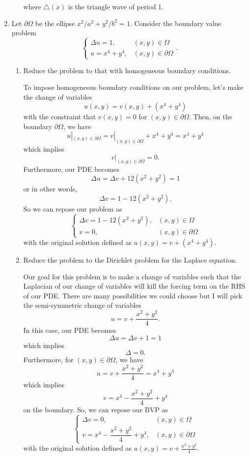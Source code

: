 \documentclass[a4paper,12pt]{article}
\begin{document}
\begin{enumerate}[label = (\arabic*)]
\begin{enumerate}[label = (\alph*)]
		where $ \triangle(x) $ is the triangle wave of period 1.
	\end{enumerate}
	
	\newpage
	\item Let $ \partial \Omega $ be the ellipse $ x^2/a^2 + y^2/b^2 = 1 $. Consider the boundary value problem
	\[
		\begin{cases}
			\Delta u = 1, & (x,y) \in \Omega \\
			u = x^4 + y^4, & (x,y) \in \partial\Omega
		\end{cases}.
	\]
	\begin{enumerate}[label = (\alph*)]
		\item Reduce the problem to that with homogeneous boundary conditions.
		
		To impose homogeneous boundary conditions on our problem, let's make the change of variables
		\[
			u(x,y) = v(x,y) + (x^4 + y^4)
		\]
		with the constraint that $ v(x,y) = 0 $ for $ (x,y) \in \partial\Omega $. Then, on the boundary $ \partial\Omega $, we have
		\[
			u|_{(x,y)\in \partial\Omega} = v|_{(x,y) \in \partial\Omega} + x^4 + y^4 = x^4 + y^4
		\]
		which implies
		\[
			v|_{(x,y)\in \partial\Omega} = 0.
		\]
		Furthermore, our PDE becomes
		\[
			\Delta u = \Delta v + 12(x^2 + y^2) = 1
		\]
		or in other words,
		\[
			\Delta v = 1 - 12(x^2 + y^2).
		\]
		So we can repose our problem as
		\[
			\boxed{\begin{cases}
				\Delta v = 1 - 12(x^2 + y^2), & (x,y) \in \Omega \\
				v = 0, & (x,y) \in \partial\Omega
			\end{cases}}
		\]
		with the original solution defined  as $ u(x,y) = v + (x^4 + y^4) $.
		
		\item Reduce the problem to the Dirichlet problem for the Laplace equation.
		
		Our goal for this problem is to make a change of variables such that the Laplacian of our change of variables will kill the forcing term on the RHS of our PDE. There are many possibilities we could choose but I will pick the semi-symmetric change of variables
		\[
			u = v + \frac{x^2 + y^2}{4}.
		\]
		In this case, our PDE becomes
		\[
			\Delta u = \Delta v + 1 = 1
		\]
		which implies
		\[
			\Delta = 0.
		\]
		Furthermore, for $ (x,y) \in \partial \Omega $, we have
		\[
			u = v + \frac{x^2 + y^2}{4} = x^4 + y^4
		\]
		which implies
		\[
			v = x^4 - \frac{x^2 + y^2}{4} + y^4
		\]
		on the boundary. So, we can repose our BVP as
		\[
			\boxed{\begin{cases}
				\Delta v = 0, & (x,y) \in \Omega \\
				v = x^4 - \dfrac{x^2 + y^2}{4} + y^4, & (x,y) \in \partial\Omega
			\end{cases}}
		\]
		with the original solution defined as $ u(x,y) = v + \frac{x^2 + y^2}{4} $.
	\end{enumerate}
\end{enumerate}
\end{document}
